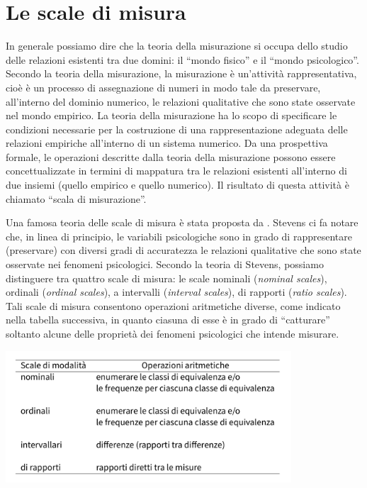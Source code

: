 \documentclass[
]{memoir}
\theoremstyle{definition}
\theoremstyle{definition}
\theoremstyle{definition}
\theoremstyle{definition}
\theoremstyle{remark}
\begin{document}
\hypertarget{le-scale-di-misura}{%
\section{Le scale di misura}\label{le-scale-di-misura}}

In generale possiamo dire che la teoria della misurazione si occupa dello studio delle relazioni esistenti tra due domini: il ``mondo fisico'' e il ``mondo psicologico''. Secondo la teoria della misurazione, la misurazione è un'attività rappresentativa, cioè è un processo di assegnazione di numeri in modo tale da preservare, all'interno del dominio numerico, le relazioni qualitative che sono state osservate nel mondo empirico. La teoria della misurazione ha lo scopo di specificare le condizioni necessarie per la costruzione di una rappresentazione adeguata delle relazioni empiriche all'interno di un sistema numerico. Da una prospettiva formale, le operazioni descritte dalla teoria della misurazione possono essere concettualizzate in termini di mappatura tra le relazioni esistenti all'interno di due insiemi (quello empirico e quello numerico). Il risultato di questa attività è chiamato ``scala di misurazione''.

Una famosa teoria delle scale di misura è stata proposta da \citet{stevens46}. Stevens ci fa notare che, in linea di principio, le variabili psicologiche sono in grado di rappresentare (preservare) con diversi gradi di accuratezza le relazioni qualitative che sono state osservate nei fenomeni psicologici. Secondo la teoria di Stevens, possiamo distinguere tra quattro scale di misura: le scale nominali (\emph{nominal scales}), ordinali (\emph{ordinal scales}), a intervalli (\emph{interval scales}), di rapporti (\emph{ratio scales}). Tali scale di misura consentono operazioni aritmetiche diverse, come indicato nella tabella successiva, in quanto ciasuna di esse è in grado di ``catturare'' soltanto alcune delle proprietà dei fenomeni psicologici che intende misurare.

\includegraphics[width=0.8\textwidth,height=\textheight]{images/misurazione_2.png}
\end{document}
